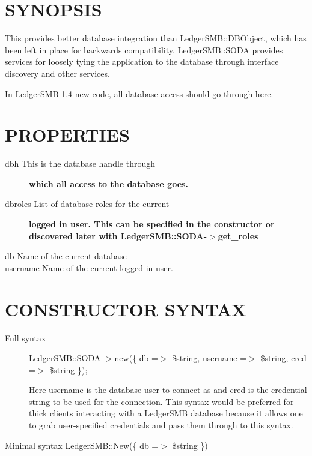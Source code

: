 \begin{description}
\begin{description}
\begin{description}
\begin{description}
\begin{description}
\begin{description}
\begin{description}
\section{SYNOPSIS\label{SYNOPSIS}}


This provides better database integration than LedgerSMB::DBObject, which has
been left in place for backwards compatibility.  LedgerSMB::SODA provides
services for loosely tying the application to the database through interface
discovery and other services.



In LedgerSMB 1.4 new code, all database access should go through here.

\section{PROPERTIES\label{PROPERTIES}}
\begin{description}

\item[{dbh This is the database handle through}] \textbf{which all access to the database goes.}
\item[{dbroles List of database roles for the current}] \textbf{logged in user. This can be specified in the constructor or discovered later with LedgerSMB::SODA-$>$get\_roles}
\item[{db
Name of the current database}] \mbox{}
\item[{username Name of the current logged in user.}] \mbox{}\end{description}
\section{CONSTRUCTOR SYNTAX\label{CONSTRUCTOR_SYNTAX}}
\begin{description}

\item[{Full syntax}] \mbox{}

LedgerSMB::SODA-$>$new(\{ db =$>$ \$string, username =$>$ \$string, cred =$>$ \$string \});



Here username is the database user to connect as and cred is the credential
string to be used for the connection.  This syntax would be preferred for thick
clients interacting with a LedgerSMB database because it allows one to grab
user-specified credentials and pass them through to this syntax.


\item[{Minimal syntax LedgerSMB::New(\{ db =$>$ \$string \})}] \mbox{}


\end{description}
\end{description}
\end{description}
\end{description}
\end{description}
\end{description}
\end{description}
\end{description}
